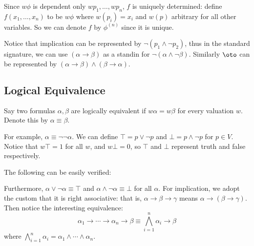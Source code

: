 \edefn

Since $w\phi$ is dependent only $wp_1,\dots,wp_n$, $f$ is uniquely determined: define
$f(x_1,\dots,x_n)$ to be $w\phi$ where $w(p_i)=x_i$ and $w(p)$ arbitrary for all other variables.
So we can denote $f$ by $\phi^{(n)}$ since it is unique.

Notice that implication can be represented by $\neg(p_1\land\neg p_2)$, thus in the standard
signature, we can use $(\alpha\to\beta)$ as a standin for $\neg(\alpha\land\neg\beta)$.
Similarly $\oto$ can be represented by $(\alpha\to\beta)\land(\beta\to\alpha)$.

\subsection{Logical Equivalence}

\bdefn

    Say two formulas $\alpha,\beta$ are {\emphcolor logically equivalent} if $w\alpha=w\beta$
    for every valuation $w$.
    Denote this by $\alpha\equiv\beta$.

\edefn

For example, $\alpha\equiv\neg\neg\alpha$.
We can define $\top=p\lor\neg p$ and $\bot=p\land\neg p$ for $p\in V$.
Notice that $w\top=1$ for all $w$, and $w\bot=0$, so $\top$ and $\bot$ represent truth and false
respectively.

The following can be easily verified:

\centerline{\vbox{\tabskip=1cm
\halign{&$#$\hfil\cr
    \alpha\land(\beta\land\gamma)\equiv(\alpha\land\beta)\land\gamma &
    \alpha\lor(\beta\lor\gamma)\equiv(\alpha\lor\beta)\lor\gamma \cr
    \alpha\land\beta\equiv\beta\land\alpha &
    \alpha\lor\beta\equiv\beta\lor\alpha\cr
    \alpha\land\alpha\equiv\alpha &
    \alpha\lor\alpha\equiv\alpha \cr
    \alpha\land(\beta\lor\gamma)\equiv(\alpha\land\beta)\lor(\alpha\land\gamma) &
    \alpha\lor(\beta\land\gamma)\equiv(\alpha\lor\beta)\land(\alpha\lor\gamma)\cr
    \neg(\alpha\land\beta)\equiv\neg\alpha\lor\neg\beta &
    \neg(\alpha\lor\beta)\equiv\neg\alpha\land\neg\beta\cr
}}}

Furthermore, $\alpha\lor\neg\alpha\equiv\top$ and $\alpha\land\neg\alpha\equiv\bot$ for all
$\alpha$.
For implication, we adopt the custom that it is right associative: that is,
$\alpha\to\beta\to\gamma$ means $\alpha\to(\beta\to\gamma)$.
Then notice the interesting equivalence:
$$ \alpha_1\to\cdots\to\alpha_n\to\beta \equiv \bigwedge_{i=1}^n\alpha_i\to\beta $$
where $\bigwedge_{i=1}^n\alpha_i=\alpha_1\wedge\cdots\wedge\alpha_n$.

